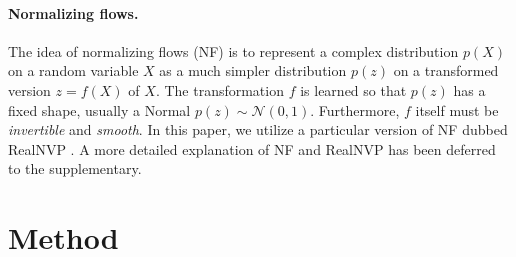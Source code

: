 \paragraph{Normalizing flows.}

The idea of normalizing flows (NF) is to represent a complex distribution $p(X)$ on a random variable $X$ as a much simpler distribution $p(z)$ on a transformed version $z=f(X)$ of $X$.
The transformation $f$ is learned so that $p(z)$ has a fixed shape, usually a Normal $p(z) \sim \mathcal{N}(0,1)$. Furthermore, $f$ itself must be \emph{invertible} and \emph{smooth}.
In this paper, we utilize a particular version of NF dubbed RealNVP \cite{dinh17density}.
A more detailed explanation of NF and RealNVP has been deferred to the supplementary.



\section{Method}\label{s:method}

